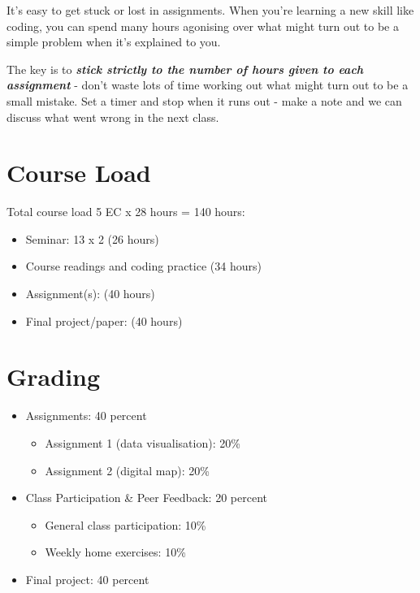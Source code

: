 \documentclass[
  letterpaper,
  DIV=11,
  numbers=noendperiod]{scrreprt}
\begin{document}
It's easy to get stuck or lost in assignments. When you're learning a
new skill like coding, you can spend many hours agonising over what
might turn out to be a simple problem when it's explained to you.

The key is to \textbf{\emph{stick strictly to the number of hours given
to each assignment}} - don't waste lots of time working out what might
turn out to be a small mistake. Set a timer and stop when it runs out -
make a note and we can discuss what went wrong in the next class.

\section*{Course Load}\label{course-load}


Total course load 5 EC x 28 hours = 140 hours:

\begin{itemize}
\item
  Seminar: 13 x 2 (26 hours)
\item
  Course readings and coding practice (34 hours)
\item
  Assignment(s): (40 hours)
\item
  Final project/paper: (40 hours)
\end{itemize}

\section*{Grading}\label{grading}


\begin{itemize}
\item
  Assignments: 40 percent

  \begin{itemize}
  \item
    Assignment 1 (data visualisation): 20\%
  \item
    Assignment 2 (digital map): 20\%
  \end{itemize}
\item
  Class Participation \& Peer Feedback: 20 percent

  \begin{itemize}
  \item
    General class participation: 10\%
  \item
    Weekly home exercises: 10\%
  \end{itemize}
\item
  Final project: 40 percent
\end{itemize}
\end{document}
